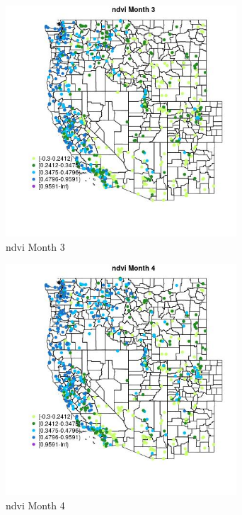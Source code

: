 \begin{figure} 
\centering  
\includegraphics[width=0.77\textwidth]{Code_Outputs/Report_ML_input_PM25_Step4_part_e_de_duplicated_aves_compiled_2019-05-21wNAs_MapObsMo3ndvi.jpg} 
\caption{\label{fig:Report_ML_input_PM25_Step4_part_e_de_duplicated_aves_compiled_2019-05-21wNAsMapObsMo3ndvi}ndvi Month 3} 
\end{figure} 
 

\begin{figure} 
\centering  
\includegraphics[width=0.77\textwidth]{Code_Outputs/Report_ML_input_PM25_Step4_part_e_de_duplicated_aves_compiled_2019-05-21wNAs_MapObsMo4ndvi.jpg} 
\caption{\label{fig:Report_ML_input_PM25_Step4_part_e_de_duplicated_aves_compiled_2019-05-21wNAsMapObsMo4ndvi}ndvi Month 4} 
\end{figure} 
 

